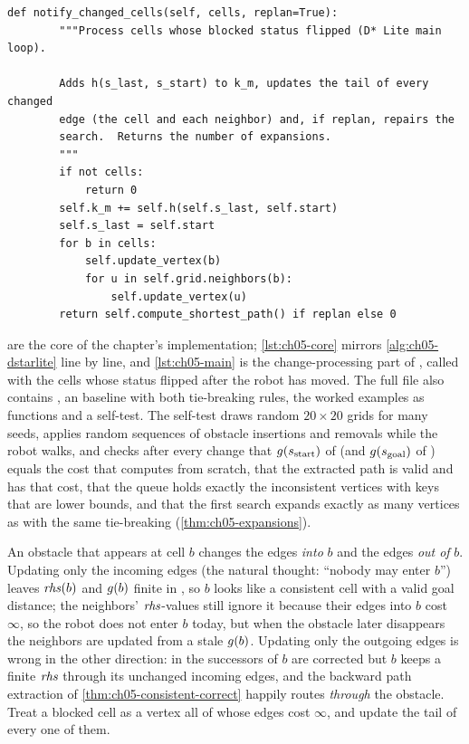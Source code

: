 \begin{lstlisting}[caption={Processing a batch of changed cells, lines~\ref{alg:ch05-dstarlite:km}--\ref{alg:ch05-dstarlite:replan} of \protect\DslMain (from \code{code/ch05\_dstar\_lite.py}).},label={lst:ch05-main}]
    def notify_changed_cells(self, cells, replan=True):
        """Process cells whose blocked status flipped (D* Lite main loop).

        Adds h(s_last, s_start) to k_m, updates the tail of every changed
        edge (the cell and each neighbor) and, if replan, repairs the
        search.  Returns the number of expansions.
        """
        if not cells:
            return 0
        self.k_m += self.h(self.s_last, self.start)
        self.s_last = self.start
        for b in cells:
            self.update_vertex(b)
            for u in self.grid.neighbors(b):
                self.update_vertex(u)
        return self.compute_shortest_path() if replan else 0
\end{lstlisting}

 are the core of the chapter's
implementation; \cref{lst:ch05-core} mirrors \cref{alg:ch05-dstarlite} line by line,
and \cref{lst:ch05-main} is the change-processing part of \DslMain, called with the
cells whose status flipped after the robot has moved. The full file also contains
\lpastar, an \astar baseline with both tie-breaking rules, the worked examples as
functions and a self-test. The self-test draws random $20\times 20$ grids for many
seeds, applies random sequences of obstacle insertions and removals while the robot
walks, and checks after every change that $g(s_{\mathrm{start}})$ of \dstarlite
(and $g(s_{\mathrm{goal}})$ of \lpastar) equals the cost that \astar computes from
scratch, that the extracted path is valid and has that cost, that the queue holds
exactly the inconsistent vertices with keys that are lower bounds, and that the first
search expands exactly as many vertices as \astar with the same tie-breaking
(\cref{thm:ch05-expansions}).

\begin{pitfall}
An obstacle that appears at cell $b$ changes the edges \emph{into} $b$ and the edges
\emph{out of} $b$. Updating only the incoming edges (the natural thought: ``nobody may
enter $b$'') leaves $\mathit{rhs}(b)$ and $g(b)$ finite in \dstarlite, so $b$ looks like a
consistent cell with a valid goal distance; the neighbors' $\mathit{rhs}$-values still ignore
it because their edges into $b$ cost $\infty$, so the robot does not enter $b$ today, but
when the obstacle later disappears the neighbors are updated from a stale $g(b)$.
Updating only the outgoing edges is wrong in the other direction: in \lpastar the
successors of $b$ are corrected but $b$ keeps a finite $\mathit{rhs}$ through its unchanged
incoming edges, and the backward path extraction of \cref{thm:ch05-consistent-correct}
happily routes \emph{through} the obstacle. Treat a blocked cell as a vertex all of
whose edges cost $\infty$, and update the tail of every one of them.
\end{pitfall}

